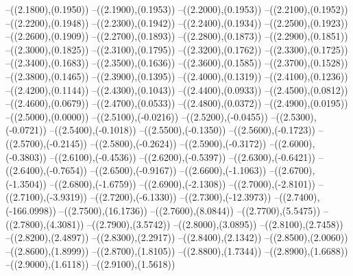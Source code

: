 {	--({\sx*(2.1800)},{\sy*(0.1950)})
	--({\sx*(2.1900)},{\sy*(0.1953)})
	--({\sx*(2.2000)},{\sy*(0.1953)})
	--({\sx*(2.2100)},{\sy*(0.1952)})
	--({\sx*(2.2200)},{\sy*(0.1948)})
	--({\sx*(2.2300)},{\sy*(0.1942)})
	--({\sx*(2.2400)},{\sy*(0.1934)})
	--({\sx*(2.2500)},{\sy*(0.1923)})
	--({\sx*(2.2600)},{\sy*(0.1909)})
	--({\sx*(2.2700)},{\sy*(0.1893)})
	--({\sx*(2.2800)},{\sy*(0.1873)})
	--({\sx*(2.2900)},{\sy*(0.1851)})
	--({\sx*(2.3000)},{\sy*(0.1825)})
	--({\sx*(2.3100)},{\sy*(0.1795)})
	--({\sx*(2.3200)},{\sy*(0.1762)})
	--({\sx*(2.3300)},{\sy*(0.1725)})
	--({\sx*(2.3400)},{\sy*(0.1683)})
	--({\sx*(2.3500)},{\sy*(0.1636)})
	--({\sx*(2.3600)},{\sy*(0.1585)})
	--({\sx*(2.3700)},{\sy*(0.1528)})
	--({\sx*(2.3800)},{\sy*(0.1465)})
	--({\sx*(2.3900)},{\sy*(0.1395)})
	--({\sx*(2.4000)},{\sy*(0.1319)})
	--({\sx*(2.4100)},{\sy*(0.1236)})
	--({\sx*(2.4200)},{\sy*(0.1144)})
	--({\sx*(2.4300)},{\sy*(0.1043)})
	--({\sx*(2.4400)},{\sy*(0.0933)})
	--({\sx*(2.4500)},{\sy*(0.0812)})
	--({\sx*(2.4600)},{\sy*(0.0679)})
	--({\sx*(2.4700)},{\sy*(0.0533)})
	--({\sx*(2.4800)},{\sy*(0.0372)})
	--({\sx*(2.4900)},{\sy*(0.0195)})
	--({\sx*(2.5000)},{\sy*(0.0000)})
	--({\sx*(2.5100)},{\sy*(-0.0216)})
	--({\sx*(2.5200)},{\sy*(-0.0455)})
	--({\sx*(2.5300)},{\sy*(-0.0721)})
	--({\sx*(2.5400)},{\sy*(-0.1018)})
	--({\sx*(2.5500)},{\sy*(-0.1350)})
	--({\sx*(2.5600)},{\sy*(-0.1723)})
	--({\sx*(2.5700)},{\sy*(-0.2145)})
	--({\sx*(2.5800)},{\sy*(-0.2624)})
	--({\sx*(2.5900)},{\sy*(-0.3172)})
	--({\sx*(2.6000)},{\sy*(-0.3803)})
	--({\sx*(2.6100)},{\sy*(-0.4536)})
	--({\sx*(2.6200)},{\sy*(-0.5397)})
	--({\sx*(2.6300)},{\sy*(-0.6421)})
	--({\sx*(2.6400)},{\sy*(-0.7654)})
	--({\sx*(2.6500)},{\sy*(-0.9167)})
	--({\sx*(2.6600)},{\sy*(-1.1063)})
	--({\sx*(2.6700)},{\sy*(-1.3504)})
	--({\sx*(2.6800)},{\sy*(-1.6759)})
	--({\sx*(2.6900)},{\sy*(-2.1308)})
	--({\sx*(2.7000)},{\sy*(-2.8101)})
	--({\sx*(2.7100)},{\sy*(-3.9319)})
	--({\sx*(2.7200)},{\sy*(-6.1330)})
	--({\sx*(2.7300)},{\sy*(-12.3973)})
	--({\sx*(2.7400)},{\sy*(-166.0998)})
	--({\sx*(2.7500)},{\sy*(16.1736)})
	--({\sx*(2.7600)},{\sy*(8.0844)})
	--({\sx*(2.7700)},{\sy*(5.5475)})
	--({\sx*(2.7800)},{\sy*(4.3081)})
	--({\sx*(2.7900)},{\sy*(3.5742)})
	--({\sx*(2.8000)},{\sy*(3.0895)})
	--({\sx*(2.8100)},{\sy*(2.7458)})
	--({\sx*(2.8200)},{\sy*(2.4897)})
	--({\sx*(2.8300)},{\sy*(2.2917)})
	--({\sx*(2.8400)},{\sy*(2.1342)})
	--({\sx*(2.8500)},{\sy*(2.0060)})
	--({\sx*(2.8600)},{\sy*(1.8999)})
	--({\sx*(2.8700)},{\sy*(1.8105)})
	--({\sx*(2.8800)},{\sy*(1.7344)})
	--({\sx*(2.8900)},{\sy*(1.6688)})
	--({\sx*(2.9000)},{\sy*(1.6118)})
	--({\sx*(2.9100)},{\sy*(1.5618)})
}
